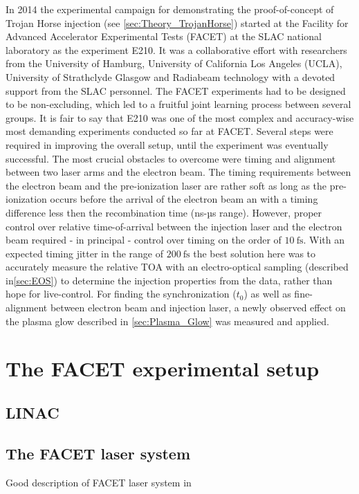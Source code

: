 


In 2014 the experimental campaign  for demonstrating the proof-of-concept of Trojan Horse injection (see \ref{sec:Theory_TrojanHorse}) started at the Facility for Advanced Accelerator Experimental Tests (FACET) at the SLAC national laboratory as the experiment E210. It was a collaborative effort with researchers from the University of Hamburg, University of California Los Angeles (UCLA), University of Strathclyde Glasgow and Radiabeam technology with a devoted support from the SLAC personnel. The FACET experiments had to be designed to be non-excluding, which led to a fruitful joint learning process between several groups.
It is fair to say that E210 was one of the most complex and accuracy-wise most demanding experiments conducted so far at FACET. 
Several steps were required in improving the overall setup, until the experiment was eventually successful.
The most crucial obstacles to overcome were timing and alignment between two laser arms and the electron beam.
The timing requirements between the electron beam and the pre-ionization laser are rather soft as long as the pre-ionization occurs before the arrival of the electron beam an with a timing difference less then the recombination time (ns-µs range). However, proper control over relative time-of-arrival between the injection laser and the electron beam required - in principal - control over timing on the order of $10\ \mathrm{fs}$. With an expected timing jitter in the range of $200\ \mathrm{fs}$ the best solution here was to accurately measure the relative TOA with an electro-optical sampling (described in\ref{sec:EOS}) to determine the injection properties from the data, rather than hope for live-control. 
For finding the synchronization ($t_0$) as well as fine-alignment between electron beam and injection laser, a newly observed effect on the plasma glow described in \ref{sec:Plasma_Glow} was measured and applied.

\section{The FACET experimental setup}
\subsection{LINAC}
\subsection{The FACET laser system}
Good description of FACET laser system in \cite{Green_FACET_Laser_PIOP}
